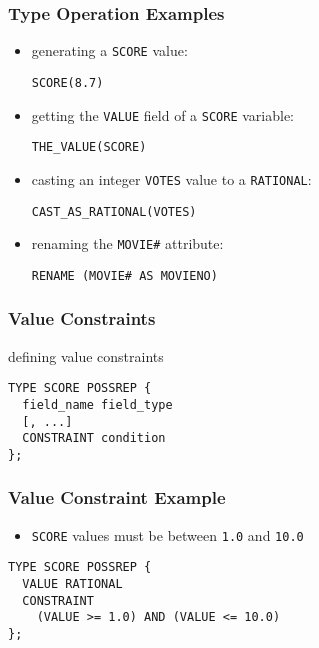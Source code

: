 \documentclass[dvipsnames]{beamer}
\theoremstyle{plain}
\begin{document}
\begin{frame}[fragile]
  \frametitle{Type Operation Examples}

  \begin{example}
    \begin{itemize}
      \item generating a \texttt{SCORE} value:
      \begin{lstlisting}
SCORE(8.7)
      \end{lstlisting}

      \pause
      \item getting the \texttt{VALUE} field of a \texttt{SCORE} variable:
      \begin{lstlisting}
THE_VALUE(SCORE)
      \end{lstlisting}

      \pause
      \item casting an integer \texttt{VOTES} value to a \texttt{RATIONAL}:
      \begin{lstlisting}
CAST_AS_RATIONAL(VOTES)
      \end{lstlisting}

      \pause
      \item renaming the \texttt{MOVIE\#} attribute:
      \begin{lstlisting}
RENAME (MOVIE# AS MOVIENO)
      \end{lstlisting}
    \end{itemize}
  \end{example}
\end{frame}

\begin{frame}[fragile]
  \frametitle{Value Constraints}

  \begin{block}{defining value constraints}
    \begin{lstlisting}
TYPE SCORE POSSREP {
  field_name field_type
  [, ...]
  CONSTRAINT condition
};
    \end{lstlisting}
  \end{block}
\end{frame}

\begin{frame}[fragile]
  \frametitle{Value Constraint Example}

  \begin{example}
    \begin{itemize}
      \item \texttt{SCORE} values must be between \texttt{1.0} and \texttt{10.0}
    \end{itemize}

    \begin{lstlisting}
TYPE SCORE POSSREP {
  VALUE RATIONAL
  CONSTRAINT
    (VALUE >= 1.0) AND (VALUE <= 10.0)
};
    \end{lstlisting}
  \end{example}
\end{frame}
\end{document}

